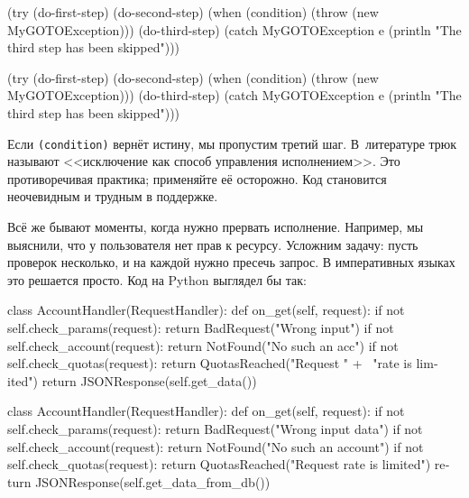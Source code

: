 \ifx\devicetype\mobile

\begin{english}
  \begin{clojure}
(try
  (do-first-step)
  (do-second-step)
  (when (condition)
    (throw (new MyGOTOException)))
  (do-third-step)
  (catch MyGOTOException e
    (println "The third step
                  has been skipped")))
  \end{clojure}
\end{english}

\else

\begin{english}
  \begin{clojure}
(try
  (do-first-step)
  (do-second-step)
  (when (condition)
    (throw (new MyGOTOException)))
  (do-third-step)
  (catch MyGOTOException e
    (println "The third step has been skipped")))
  \end{clojure}
\end{english}

\fi

Если \verb|(condition)| вернёт истину, мы пропустим третий шаг. В~литературе
трюк называют <<исключение как способ управления исполнением>>. Это
противоречивая практика; применяйте её осторожно. Код становится неочевидным и
трудным в поддержке.


Всё же бывают моменты, когда нужно прервать исполнение. Например, мы
выяснили, что у пользователя нет прав к ресурсу. Усложним задачу: пусть проверок
несколько, и на каждой нужно пресечь запрос. В императивных языках это решается
просто. Код на Python выглядел бы так:


\ifx\devicetype\mobile

\begin{english}
  \begin{python}
class AccountHandler(RequestHandler):
  def on_get(self, request):
    if not self.check_params(request):
      return BadRequest("Wrong input")
    if not self.check_account(request):
      return NotFound("No such an acc")
    if not self.check_quotas(request):
      return QuotasReached("Request " + \
             "rate is limited")
    return JSONResponse(self.get_data())
  \end{python}
\end{english}

\else

\begin{english}
  \begin{python}
class AccountHandler(RequestHandler):
  def on_get(self, request):
    if not self.check_params(request):
      return BadRequest("Wrong input data")
    if not self.check_account(request):
      return NotFound("No such an account")
    if not self.check_quotas(request):
      return QuotasReached("Request rate is limited")
    return JSONResponse(self.get_data_from_db())
  \end{python}
\end{english}


